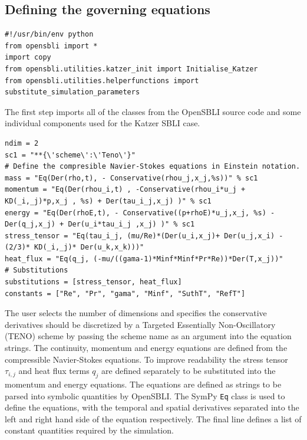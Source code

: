 \documentclass[11pt]{article}
\begin{document}
\subsection{Defining the governing equations}
\begin{lstlisting}
#!/usr/bin/env python
from opensbli import *
import copy
from opensbli.utilities.katzer_init import Initialise_Katzer
from opensbli.utilities.helperfunctions import substitute_simulation_parameters
\end{lstlisting}
The first step imports all of the classes from the OpenSBLI source code and some individual components used for the Katzer SBLI case.

\begin{lstlisting}
ndim = 2
sc1 = "**{\'scheme\':\'Teno\'}"
# Define the compresible Navier-Stokes equations in Einstein notation.
mass = "Eq(Der(rho,t), - Conservative(rhou_j,x_j,%s))" % sc1
momentum = "Eq(Der(rhou_i,t) , -Conservative(rhou_i*u_j + KD(_i,_j)*p,x_j , %s) + Der(tau_i_j,x_j) )" % sc1
energy = "Eq(Der(rhoE,t), - Conservative((p+rhoE)*u_j,x_j, %s) - Der(q_j,x_j) + Der(u_i*tau_i_j ,x_j) )" % sc1
stress_tensor = "Eq(tau_i_j, (mu/Re)*(Der(u_i,x_j)+ Der(u_j,x_i) - (2/3)* KD(_i,_j)* Der(u_k,x_k)))"
heat_flux = "Eq(q_j, (-mu/((gama-1)*Minf*Minf*Pr*Re))*Der(T,x_j))"
# Substitutions
substitutions = [stress_tensor, heat_flux]
constants = ["Re", "Pr", "gama", "Minf", "SuthT", "RefT"]
\end{lstlisting}
The user selects the number of dimensions and specifies the conservative derivatives should be discretized by a Targeted Essentially Non-Oscillatory (TENO) scheme by passing the scheme name as an argument into the equation strings. The continuity, momentum and energy equations are defined from the compressible Navier-Stokes equations. To improve readability the stress tensor $\tau_{i,j}$ and heat flux terms $q_j$ are defined separately to be substituted into the momentum and energy equations. The equations are defined as strings to be parsed into symbolic quantities by OpenSBLI. The SymPy \verb|Eq| class is used to define the equations, with the temporal and spatial derivatives separated into the left and right hand side of the equation respectively. The final line defines a list of constant quantities required by the simulation.
\end{document}
